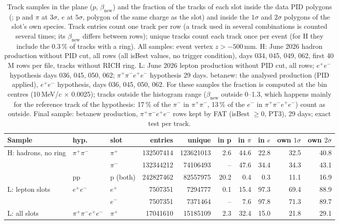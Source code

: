 \begin{table}[H]
\centering
\caption{Track samples in the plane ($p$, $\beta_{\mathrm{new}}$) and the fraction of the tracks of each slot inside the data PID polygons (; p and $\pi$ at $3\sigma$, $e$ at $5\sigma$, polygon of the same charge as the slot) and inside the $1\sigma$ and $2\sigma$ polygons of the slot's own species. Track entries count one track per row (a track used in several combinations is counted several times; its $\beta_{\mathrm{new}}$ differs between rows); unique tracks count each track once per event (for H they include the 0.3\,\% of tracks with a ring). All samples: event vertex $z>-500$\,mm. H: June 2026 hadron production without PID cut, all rows (all isBest values, no trigger condition), days 034, 045, 049, 062, first 40\,M rows per file, tracks without RICH ring. L: June 2026 lepton production without PID cut, all rows; $e^+e^-$ hypothesis days 036, 045, 050, 062; $\pi^+\pi^-e^+e^-$ hypothesis 29 days. betanew: the analysed production (PID applied), $e^+e^-$ hypothesis, days 036, 045, 050, 062. For these samples the fraction is computed at the bin centres (10\,MeV/$c$ $\times$ 0.0025); tracks outside the histogram range ($\beta_{\mathrm{new}}$ outside 0--1.3, which happens mainly for the reference track of the hypothesis: 17\,\% of the $\pi^-$ in $\pi^+\pi^-$, 13\,\% of the $e^-$ in $\pi^+\pi^-e^+e^-$) count as outside. Final sample: betanew production, $\pi^+\pi^-e^+e^-$ rows kept by FAT (isBest $\geq 0$, PT3), 29 days; exact test per track.}
\label{tab:pid_samples}
\scriptsize
\setlength{\tabcolsep}{3pt}
\begin{tabular}{@{}l l l r r r r r r r@{}}
\toprule
Sample & hyp. & slot & entries & unique & in p & in $\pi$ & in $e$ & own $1\sigma$ & own $2\sigma$ \\
\midrule
H: hadrons, no ring & $\pi^+\pi^-$ & $\pi^+$ & 132507414 & 123621013 & 2.6 & 44.6 & 22.8 & 32.5 & 40.8 \\
 &  & $\pi^-$ & 132344212 & 74106493 & -- & 47.6 & 34.4 & 34.3 & 43.1 \\
 & pp & p (both) & 242827462 & 82557975 & 20.2 & 0.4 & 0.3 & 11.1 & 16.9 \\
\midrule
L: lepton slots & $e^+e^-$ & $e^+$ & 7507351 & 7294777 & 0.1 & 15.4 & 97.3 & 69.4 & 88.9 \\
 &  & $e^-$ & 7507351 & 7371464 & -- & 7.6 & 97.8 & 71.3 & 89.7 \\
\midrule
L: all slots & $\pi^+\pi^-e^+e^-$ & $\pi^+$ & 17041610 & 15185109 & 2.3 & 32.4 & 15.0 & 21.8 & 29.1 \\

\end{tabular}
\end{table}
